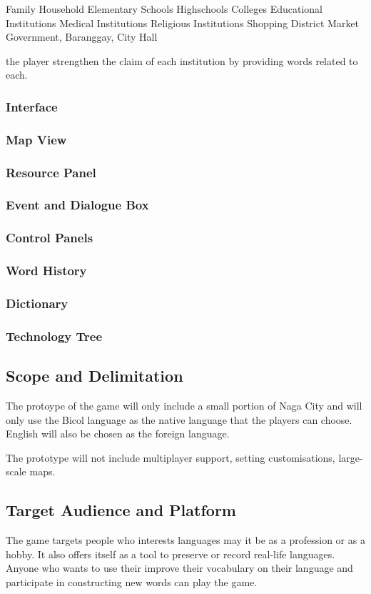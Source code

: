 \documentclass[11pt]{article}
\begin{document}
Family Household
Elementary Schools
Highschools
Colleges
Educational Institutions
Medical Institutions
Religious Institutions
Shopping District
Market
Government, Baranggay, City Hall

the player strengthen the claim of each institution by providing words related to each.

\subsubsection{Interface}
\subsubsection{Map View}
\subsubsection{Resource Panel}
\subsubsection{Event and Dialogue Box}
\subsubsection{Control Panels}
\subsubsection{Word History}
\subsubsection{Dictionary}
\subsubsection{Technology Tree}



\subsection{Scope and Delimitation}
The protoype of the game will only include a small portion of Naga City and will only use the Bicol language as the native language that the players can choose. English will also be chosen as the foreign language.

The prototype will not include multiplayer support, setting customisations, large-scale maps.



\subsection{Target Audience and Platform}
The game targets people who interests languages may it be as a profession or as a hobby. It also offers itself as a tool to preserve or record real-life languages. Anyone who wants to use their improve their vocabulary on their language and participate in constructing new words can play the game.
\end{document}
